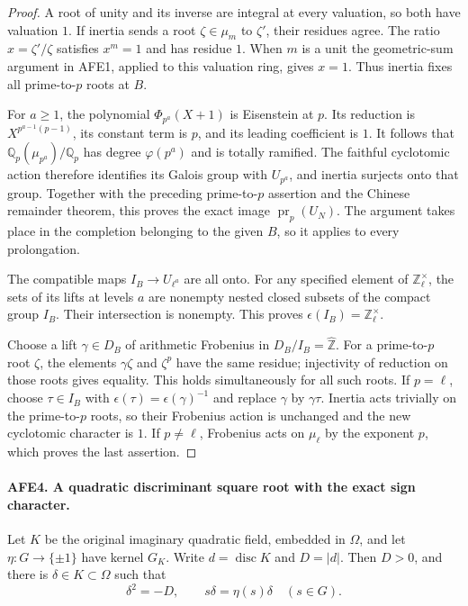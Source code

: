 \documentclass[11pt,a4paper]{article}
\numberwithin{equation}{section}
\theoremstyle{remark}\newtheorem{remark}[theorem]{Remark}
\begin{document}
\begin{proof}
A root of unity and its inverse are integral at every
valuation, so both have valuation \(1\).
If inertia sends a root \(\zeta\in\mu_m\) to \(\zeta'\),
their residues agree.  The ratio \(x=\zeta'/\zeta\)
satisfies \(x^m=1\) and has residue \(1\).
When \(m\) is a unit the geometric-sum argument in
AFE1, applied to this valuation ring, gives \(x=1\).
Thus inertia fixes all prime-to-\(p\) roots at \(B\).

For \(a\ge1\), the polynomial
\(\Phi_{p^a}(X+1)\) is Eisenstein at \(p\).
Its reduction is \(X^{p^{a-1}(p-1)}\), its constant
term is \(p\), and its leading coefficient is \(1\).
It follows that \(\mathbb Q_p(\mu_{p^a})/\mathbb Q_p\)
has degree \(\varphi(p^a)\) and is totally ramified.
The faithful cyclotomic action therefore identifies its
Galois group with \(U_{p^a}\), and inertia surjects onto
that group.  Together with the preceding prime-to-\(p\)
assertion and the Chinese remainder theorem, this proves
the exact image \(\operatorname{pr}_p(U_N)\).
The argument takes place in the completion belonging to
the given \(B\), so it applies to every prolongation.

The compatible maps \(I_B\to U_{\ell^a}\) are all onto.
For any specified element of \(\mathbb Z_\ell^\times\),
the sets of its lifts at levels \(a\) are nonempty nested
closed subsets of the compact group \(I_B\).
Their intersection is nonempty.  This proves
\(\epsilon(I_B)=\mathbb Z_\ell^\times\).

Choose a lift \(\gamma\in D_B\) of arithmetic Frobenius
in \(D_B/I_B=\widehat{\mathbb Z}\).
For a prime-to-\(p\) root \(\zeta\), the elements
\(\gamma\zeta\) and \(\zeta^p\) have the same residue;
injectivity of reduction on those roots gives equality.
This holds simultaneously for all such roots.
If \(p=\ell\), choose \(\tau\in I_B\) with
\(\epsilon(\tau)=\epsilon(\gamma)^{-1}\) and replace
\(\gamma\) by \(\gamma\tau\).  Inertia acts trivially
on the prime-to-\(p\) roots, so their Frobenius action
is unchanged and the new cyclotomic character is \(1\).
If \(p\ne\ell\), Frobenius acts on \(\mu_\ell\)
by the exponent \(p\), which proves the last assertion.
\end{proof}

\paragraph{AFE4. A quadratic discriminant square root with the exact sign character.}
\label{claim:AFE4}
Let \(K\) be the original imaginary quadratic field,
embedded in \(\Omega\), and let
\(\eta:G\to\{\pm1\}\) have kernel \(G_K\).
Write \(d=\operatorname{disc}K\) and \(D=|d|\).
Then \(D>0\), and there is \(\delta\in K\subset\Omega\)
such that
\[
       \delta^2=-D,\qquad s\delta=\eta(s)\delta
                          \quad(s\in G).                \tag{AFE.4}
\]
\end{document}
